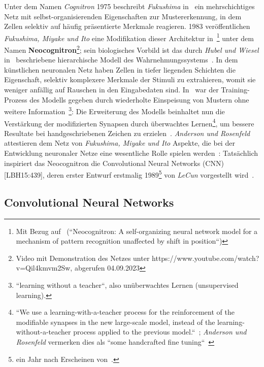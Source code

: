 Unter dem Namen \textit{Cognitron} 1975 beschreibt \textit{Fukushima} in~\cite{Fuk75} ein mehrschichtiges Netz mit selbst-organisierenden Eigenschaften zur Mustererkennung, in dem Zellen selektiv auf häufig präsentierte Merkmale reagieren.
1983 veröffentlichen \textit{Fukushima, Miyake und Ito} eine Modifikation dieser Architektur in~\cite{FMI83}\footnote{
    Mit Bezug auf~\cite{Fuk80} (``Neocognitron: A self-organizing neural network model for a mechanism of pattern recognition unaffected by shift in position``)
} unter dem Namen \textbf{Neocognitron}\footnote{
    Video mit Demonstration des Netzes unter https://www.youtube.com/watch?v=Qil4kmvm2Sw, abgerufen 04.09.2023
}; sein biologisches Vorbild ist das durch \textit{Hubel und Wiesel} in~\cite{HW62} beschriebene hierarchische Modell des Wahrnehmungssystems~\cite[827]{FMI83}.
In dem künstlichen neuronalen Netz haben Zellen in tiefer liegenden Schichten die Eigenschaft, selektiv komplexere Merkmale der Stimuli zu extrahieren, womit sie weniger anfällig auf Rauschen in den Eingabedaten sind.
In~\cite{Fuk80} war der Training-Prozess des Modells gegeben durch wiederholte Einspeisung von Mustern ohne weitere Information~\cite[197]{Fuk80}\footnote{
    ``learning without a teacher``, also unüberwachtes Lernen (unsupervised learning).
}: Die Erweiterung des Modells beinhaltet nun die Verstärkung der modifizierten Synapsen durch überwachtes Lernen\footnote{
    ``We use a learning-with-a-teacher process for the reinforcement of the modifiable synapses in the new large-scale
model, instead of the learning-without-a-teacher process applied to the previous model.``~\cite[827]{FMI83}; \textit{Anderson und Rosenfeld} vermerken dies als ``some handcrafted fine tuning``~\cite[524 f.]{AR88}
}, um bessere Resultate bei handgeschriebenen Zeichen zu erzielen~\cite[829]{FMI83}.
\textit{Anderson und Rosenfeld} attestieren dem Netz von \textit{Fukushima, Miyake und Ito} Aspekte, die bei der Entwicklung neuronaler Netze eine wesentliche Rolle spielen werden~\cite[524]{AR88}:  Tatsächlich inspiriert das Neocognitron die Convolutional Neural Networks (CNN) [LBH15:439], deren erster Entwurf erstmalig 1989\footnote{
    ein Jahr nach Erscheinen von~\cite{AR88}.
} von \textit{LeCun} vorgestellt wird~\cite{Cun89}.



\subsection{Convolutional Neural Networks}\label{cnn}

